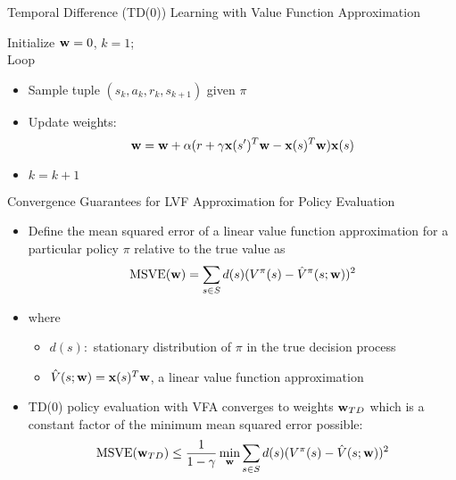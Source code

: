 \documentclass[aspectratio=169]{../latex_main/tntbeamer}  %
\begin{document}
\begin{frame}[c]{Temporal Difference (TD(0)) Learning with Value
		Function Approximation}

Initialize $\mathbf{w}= 0$, $k=1$;\\
Loop
	\begin{itemize}
		\item Sample tuple $(s_k, a_k, r_k, s_{k+1})$ given $\pi$
		\item Update weights:
		$$ \mathbf{w} = \mathbf{w} + \alpha( r + \gamma \mathbf{x}(s')^T \mathbf{w} - \mathbf{x}(s)^T\mathbf{w}) \mathbf{x}(s) $$
		\item $k = k + 1$
	\end{itemize}

\end{frame}
\begin{frame}[c]{Convergence Guarantees for LVF
		Approximation for Policy Evaluation}
	
\begin{itemize}
	\item Define the mean squared error of a linear value function
	approximation for a particular policy $\pi$ relative to the true value as
	$$\text{MSVE}(\mathbf{w}) = \sum_{s\in S} d(s) (V^\pi(s) - \hat{V}^\pi (s;\mathbf{w}))^2$$
	\item where
	\begin{itemize}
		\item $d(s):$ stationary distribution of $\pi$ in the true decision process
		\item $\hat{V}(s;\mathbf{w}) = \mathbf{x}(s)^T \mathbf{w}$, a linear value function approximation
	\end{itemize}
	\item TD(0) policy evaluation with VFA converges to weights $\mathbf{w}_{TD}$ which is a constant factor of the minimum mean squared error possible:
	$$\text{MSVE}(\mathbf{w}_{TD}) \leq \frac{1}{1-\gamma} \min_{\mathbf{w}}\sum_{s\in S} d(s) (V^\pi(s) - \hat{V}(s;\mathbf{w}))^2$$
\end{itemize}

	
\end{frame}
\end{document}

